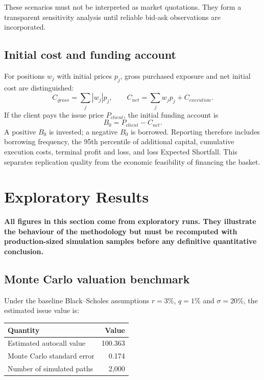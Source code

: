 \documentclass[11pt,a4paper]{article}
\newcommand{\important}[1]{\par\noindent\colorbox{pale}{\parbox{0.96\linewidth}{\color{navy}\textbf{#1}}}\par}
\begin{document}
These scenarios must not be interpreted as market quotations. They form a transparent sensitivity analysis until reliable bid-ask observations are incorporated.

\subsection{Initial cost and funding account}

For positions $w_j$ with initial prices $p_j$, gross purchased exposure and net initial cost are distinguished:
\[
C_{gross}=\sum_j |w_j|p_j,
\qquad
C_{net}=\sum_j w_jp_j+C_{execution}.
\]
If the client pays the issue price $P_{client}$, the initial funding account is
\[
B_0=P_{client}-C_{net}.
\]
A positive $B_0$ is invested; a negative $B_0$ is borrowed. Reporting therefore includes borrowing frequency, the 95th percentile of additional capital, cumulative execution costs, terminal profit and loss, and loss Expected Shortfall. This separates replication quality from the economic feasibility of financing the basket.

\section{Exploratory Results}

\important{All figures in this section come from exploratory runs. They illustrate the behaviour of the methodology but must be recomputed with production-sized simulation samples before any definitive quantitative conclusion.}

\subsection{Monte Carlo valuation benchmark}

Under the baseline Black--Scholes assumptions $r=3\%$, $q=1\%$ and $\sigma=20\%$, the estimated issue value is:

\begin{center}
\begin{tabular}{lr}
\toprule
Quantity & Value \\
\midrule
Estimated autocall value & 100.363 \\
Monte Carlo standard error & 0.174 \\
Number of simulated paths & 2,000 \\
\bottomrule
\end{tabular}
\end{center}
\end{document}
